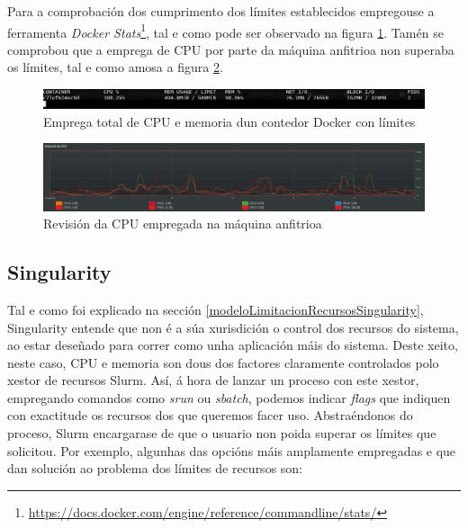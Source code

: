 Para a comprobación dos cumprimento dos límites establecidos empregouse a ferramenta \textit{Docker Stats}\footnote{\url{https://docs.docker.com/engine/reference/commandline/stats/}}, tal e como pode ser observado na figura \ref{MemoriaFull}. Tamén se comprobou que a emprega de CPU por parte da máquina anfitrioa non superaba os límites, tal e como amosa a figura \ref{CPUDocker}.

\begin{figure}[]
\centerline{\includegraphics[width=15cm]{figuras/MemoriaFull.png}}
\caption{Emprega total de CPU e memoria dun contedor Docker con límites}
\label{MemoriaFull}
\end{figure}

\begin{figure}[]
\centerline{\includegraphics[width=15cm]{figuras/CPUDocker.png}}
\caption{Revisión da CPU empregada na máquina anfitrioa}
\label{CPUDocker}
\end{figure}

\subsection{Singularity}

Tal e como foi explicado na sección \ref{modeloLimitacionRecursosSingularity}, Singularity entende que non é a súa xurisdición o control dos recursos do sistema, ao estar deseñado para correr como unha aplicación máis do sistema. Deste xeito, neste caso, CPU e memoria son dous dos factores claramente controlados polo xestor de recursos Slurm. Así, á hora de lanzar un proceso con este xestor, empregando comandos como {\it srun} ou {\it sbatch}, podemos indicar \textit{flags} que indiquen con exactitude os recursos dos que queremos facer uso. Abstraéndonos do proceso, Slurm encargarase de que o usuario non poida superar os límites que solicitou. Por exemplo, algunhas das opcións máis amplamente empregadas e que dan solución ao problema dos límites de recursos son:

